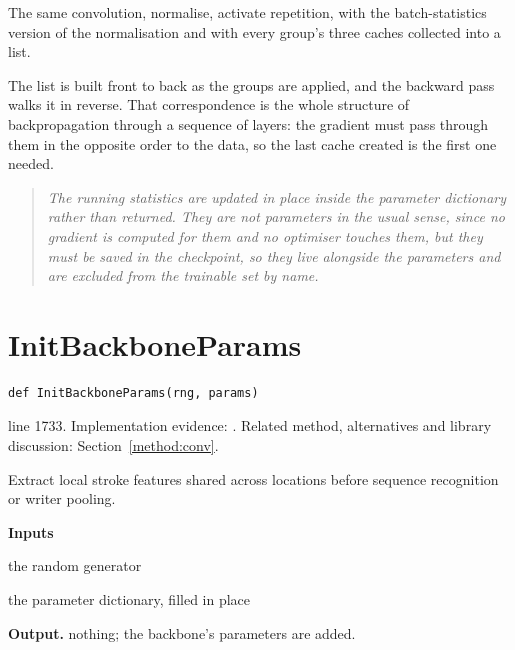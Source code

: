The same convolution, normalise, activate repetition, with the batch-statistics version of the normalisation and with every group's three caches collected into a list.


The list is built front to back as the groups are applied, and the backward pass walks it in reverse. That correspondence is the whole structure of backpropagation through a sequence of layers: the gradient must pass through them in the opposite order to the data, so the last cache created is the first one needed.


\begin{quote}\small\itshape The running statistics are updated in place inside the parameter dictionary rather than returned. They are not parameters in the usual sense, since no gradient is computed for them and no optimiser touches them, but they must be saved in the checkpoint, so they live alongside the parameters and are excluded from the trainable set by name.\end{quote}


\section{InitBackboneParams}\label{fn:train:InitBackboneParams}
\begin{lstlisting}[style=sig]
def InitBackboneParams(rng, params)
\end{lstlisting}
 line 1733. Implementation evidence: \cite{code2026}. Related method, alternatives and library discussion: Section~\ref{method:conv}.


Extract local stroke features shared across locations before sequence recognition or writer pooling.




\noindent\textbf{Inputs}
\begin{description}[leftmargin=2.2em,style=nextline,font=\normalfont\ttfamily]\setlength\itemsep{1pt}
  \item[{rng}] \normalfont the random generator
  \item[{params}] \normalfont the parameter dictionary, filled in place
\end{description}

\noindent\textbf{Output.} nothing; the backbone's parameters are added.


